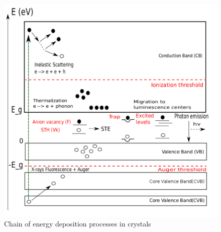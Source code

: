 \begin{figure}
\centering
\includegraphics[width=12cm]{../Pictures/Chapter_2/drawing_2.pdf}
\caption[Energy deposition in scintillator]{Chain of energy deposition processes in crystals}
\label{fig:lecoq_easy}
\end{figure}

